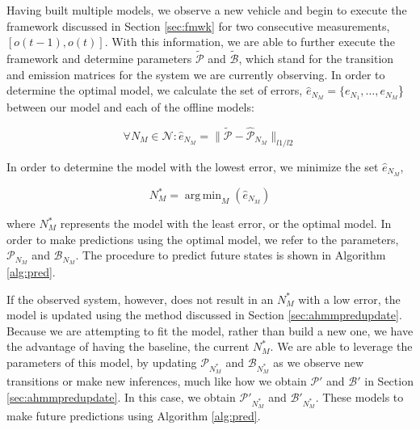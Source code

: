 \documentclass[conference]{IEEEtran}
\DeclareMathOperator*{\argmin}{arg\,min}
\newcommand\NB[1]{$\spadesuit$\footnote{NB: #1}}
\begin{document}
Having built multiple models, we observe a new vehicle and begin to execute the framework discussed in Section \ref{sec:fmwk} for two consecutive measurements, $\left[o(t-1),o(t)\right]$. With this information, we are able to further execute the framework and determine parameters $\tilde{\mathcal{P}}$ and $\tilde{\mathcal{B}}$, which stand for the transition and emission matrices for the system we are currently observing. In order to determine the optimal model, we calculate the set of errors, $\hat{e}_{N_{M}} = \{e_{N_1},\ldots,e_{N_M}$\} between our model and each of the offline models:

\begin{equation}
    \forall{N_M} \in \mathcal{N}: \hat{e}_{N_M} = \lVert\tilde{\mathcal{P}}-\hat{\mathcal{P}}_{N_M}\rVert_{l1/l2}
\end{equation}

In order to determine the model with the lowest error, we minimize the set $\hat{e}_{N_M}$,

\begin{equation}
    N_M^* = \argmin_{M}(\hat{e}_{N_M})
\end{equation}

where $N_M^*$ represents the model with the least error, or the optimal model. In order to make predictions using the optimal model, we refer to the parameters, $\mathcal{P}_{N_M}$ and $\mathcal{B}_{N_M}$. The procedure to predict future states is shown in Algorithm \ref{alg:pred}.

If the observed system, however, does not result in an $N_M^*$ with a low error, the model is updated using the method discussed in Section \ref{sec:ahmmpredupdate}. Because we are attempting to fit the model, rather than build a new one, we have the advantage of having the baseline, the current $N_M^*$. We are able to leverage the parameters of this model, by  updating $\mathcal{P}_{N_M^*}$ and $\mathcal{B}_{N_M^*}$ as we observe new transitions or make new inferences, much like how we obtain $\mathcal{P}'$ and $\mathcal{B}'$ in Section \ref{sec:ahmmpredupdate}. In this case, we obtain $\mathcal{P}'_{N_M^*}$ and $\mathcal{B}'_{N_M^*}$. These models to make future predictions using Algorithm \ref{alg:pred}.
\end{document}
